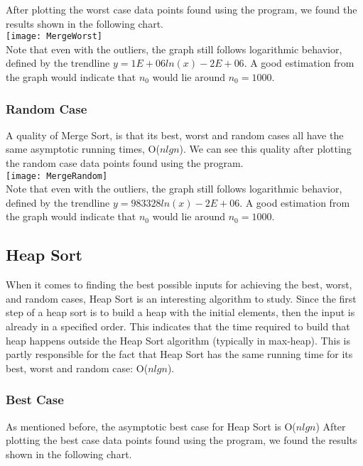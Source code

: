 \documentclass[12pt]{article}
\begin{document}
After plotting the worst case data points found using the program, we found the results shown in the following chart. \\

\texttt{[image: MergeWorst]}\\

Note that even with the outliers, the graph still follows logarithmic behavior, defined by the trendline $y = 1E+06ln(x) - 2E+06$. A good estimation from the graph would indicate that $n_0$ would lie around $n_0 = 1000 $.
\subsubsection*{Random Case}

A quality of Merge Sort, is that its best, worst and random cases all have the same asymptotic running times, O($nlgn$). We can see this quality after plotting the random case data points found using the program.\\

\texttt{[image: MergeRandom]}\\

Note that even with the outliers, the graph still follows logarithmic behavior, defined by the trendline $y = 983328ln(x) - 2E+06
 $. A good estimation from the graph would indicate that $n_0$ would lie around $n_0 = 1000 $.

\subsection*{Heap Sort}

When it comes to finding the best possible inputs for achieving the best, worst, and random cases, Heap Sort is an interesting algorithm to study. Since the first step of a heap sort is to build a heap with the initial elements, then the input is already in a specified order. This indicates that the time required to build that heap happens outside the Heap Sort algorithm (typically in max-heap). This is partly responsible for the fact that Heap Sort has the same running time for its best, worst and random case: O($nlgn$). 
 
\subsubsection*{Best Case}

As mentioned before, the asymptotic best case for Heap Sort is O($nlgn$) After plotting the best case data points found using the program, we found the results shown in the following chart. \\
\end{document}

